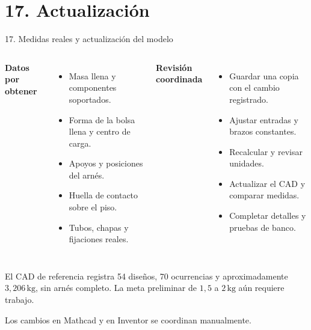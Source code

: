 \documentclass[10pt,aspectratio=169]{beamer}
\newcommand{\kg}{\,\mathrm{kg}}
\newcommand{\mcref}{Guía de lectura}
\begin{document}
\section{17. Actualización}
\gdef\mcref{Mathcad / sección 17}
\begin{frame}[t,label=mc17]{17. Medidas reales y actualización del modelo}
\begin{columns}[T,onlytextwidth]
\textbf{Datos por obtener}
\begin{itemize}
 \item Masa llena y componentes soportados.
 \item Forma de la bolsa llena y centro de carga.
 \item Apoyos y posiciones del arnés.
 \item Huella de contacto sobre el piso.
 \item Tubos, chapas y fijaciones reales.
\end{itemize}
\textbf{Revisión coordinada}
\begin{itemize}
 \item Guardar una copia con el cambio registrado.
 \item Ajustar entradas y brazos constantes.
 \item Recalcular y revisar unidades.
 \item Actualizar el CAD y comparar medidas.
 \item Completar detalles y pruebas de banco.
\end{itemize}
\end{columns}
\medskip
El CAD de referencia registra 54 diseños, 70 ocurrencias y aproximadamente
\(3{,}206\kg\), sin arnés completo.
La meta preliminar de \(1{,}5\) a \(2\kg\) aún requiere trabajo.

Los cambios en Mathcad y en Inventor se coordinan manualmente.
\end{frame}

\appendix
\end{document}
